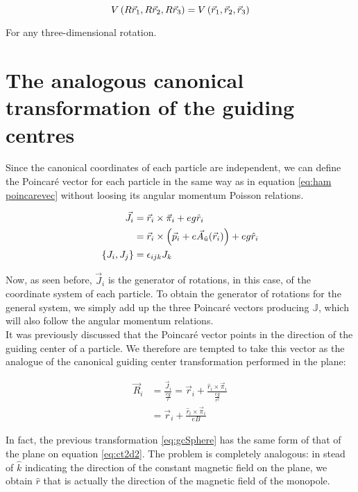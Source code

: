 \begin{equation*}
 V\left( R\vec{r}_1,R\vec{r}_2,R\vec{r}_3 \right) =  V\left( \vec{r}_1,\vec{r}_2,\vec{r}_3 \right) 
\end{equation*}

For any three-dimensional rotation.\\

\section{The analogous canonical transformation of the guiding centres}
Since the canonical coordinates of each particle are independent, we can define the Poincar\'e vector for each particle in the same way as in equation \eqref{eq:ham poincarevec} without loosing its angular momentum Poisson relations.

\begin{align*}
\vec{J}_i &= \vec{r}_i\times\vec{\pi}_i + eg\hat{r}_i\\
&= \vec{r}_i\times\left( \vec{p}_i+e\vec{A}_{\hat{u}}(\vec{r}_i) \right) + eg\hat{r}_i\\
\left\lbrace J_i, J_j \right\rbrace &= \epsilon_{ijk}J_k
\end{align*}

Now, as seen before, $\vec{J}_i$ is the generator of rotations, in this case, of the coordinate system of each particle. To obtain the generator of rotations for the general system, we simply add up the three Poincar\'e vectors producing $\mathbb{J}$, which will also follow the angular momentum relations.\\

It was previously discussed that the Poincar\'e vector points in the direction of the guiding center of a particle. We therefore are tempted to take this vector as the analogue of the canonical guiding center transformation performed in the plane:

\begin{align}
\vec{R}_i &= \frac{\vec{J}_i}{\frac{eg}{r}} = \vec{r}_i + \frac{\hat{r}_i\times\vec{\pi}_i}{\frac{eg}{r^2}} \nonumber\\
&= \vec{r}_i + \frac{\hat{r}_i\times\vec{\pi}_i}{eB}
\label{eq:gcSphere}
\end{align}

In fact, the previous transformation \eqref{eq:gcSphere} has the same form of that of the plane on equation \eqref{eq:ct2d2}. The problem is completely analogous: in stead of $\hat{k}$ indicating the direction of the constant magnetic field on the plane, we obtain $\hat{r}$ that is actually the direction of the magnetic field of the monopole. \\

